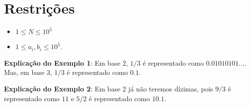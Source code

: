 
\section*{Restrições}

\begin{itemize}
\item $1 \leq N \leq 10^5$
\item $1 \leq a_i, b_i \leq 10^5$.
\end{itemize}

\exemplo

\bigskip
\textbf{Explicação do Exemplo 1}: Em base 2, $1/3$ é representado como $0.01010101...$. Mas, em base 3, $1/3$ é representado como $0.1$.

\textbf{Explicação do Exemplo 2}: Em base 2 já não teremos dízimas, pois $9/3$ é representado como $11$ e $5/2$ é representado como $10.1$.
